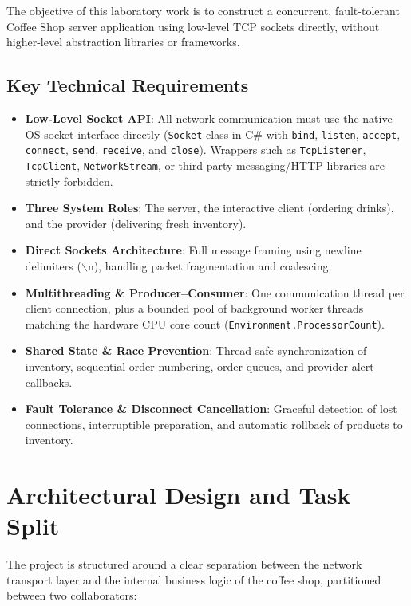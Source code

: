 \documentclass[11pt,a4paper]{article}
\begin{document}
The objective of this laboratory work is to construct a concurrent, fault-tolerant Coffee Shop server application using low-level TCP sockets directly, without higher-level abstraction libraries or frameworks.

\subsection{Key Technical Requirements}
\begin{itemize}[noitemsep]
    \item \textbf{Low-Level Socket API}: All network communication must use the native OS socket interface directly (\texttt{Socket} class in C\# with \texttt{bind}, \texttt{listen}, \texttt{accept}, \texttt{connect}, \texttt{send}, \texttt{receive}, and \texttt{close}). Wrappers such as \texttt{TcpListener}, \texttt{TcpClient}, \texttt{NetworkStream}, or third-party messaging/HTTP libraries are strictly forbidden.
    \item \textbf{Three System Roles}: The server, the interactive client (ordering drinks), and the provider (delivering fresh inventory).
    \item \textbf{Direct Sockets Architecture}: Full message framing using newline delimiters ($\backslash\text{n}$), handling packet fragmentation and coalescing.
    \item \textbf{Multithreading \& Producer--Consumer}: One communication thread per client connection, plus a bounded pool of background worker threads matching the hardware CPU core count (\texttt{Environment.ProcessorCount}).
    \item \textbf{Shared State \& Race Prevention}: Thread-safe synchronization of inventory, sequential order numbering, order queues, and provider alert callbacks.
    \item \textbf{Fault Tolerance \& Disconnect Cancellation}: Graceful detection of lost connections, interruptible preparation, and automatic rollback of products to inventory.
\end{itemize}

\section{Architectural Design and Task Split}

The project is structured around a clear separation between the network transport layer and the internal business logic of the coffee shop, partitioned between two collaborators:
\end{document}

